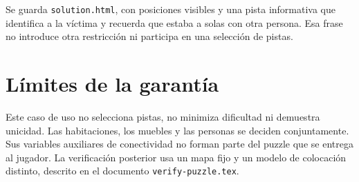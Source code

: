 \documentclass[11pt,a4paper]{article}
\begin{document}
Se guarda \texttt{solution.html}, con posiciones visibles y una
pista informativa que identifica a la v\'ictima y recuerda que
estaba a solas con otra persona. Esa frase no introduce otra
restricci\'on ni participa en una selecci\'on de pistas.

\section{L\'imites de la garant\'ia}

Este caso de uso no selecciona pistas, no minimiza dificultad ni
demuestra unicidad. Las habitaciones, los muebles y las personas se
deciden conjuntamente. Sus variables auxiliares de conectividad no
forman parte del puzzle que se entrega al jugador. La verificaci\'on
posterior usa un mapa fijo y un modelo de colocaci\'on distinto,
descrito en el documento \texttt{verify-puzzle.tex}.
\end{document}
